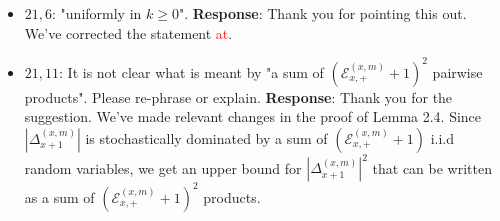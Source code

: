 \documentclass[11pt,a4paper]{article}
\numberwithin{equation}{section}
\newcommand{\abs}[1]{\left\vert #1 \right\vert}
\def\TBF#1{\textcolor{red}{#1}} %
\begin{document}
\begin{itemize}
		\item 
		$21,6$: "uniformly in $k\geq 0$".
		\subitem \textbf{Response}:  Thank you for pointing this out.  We've corrected the statement \TBF{at}. 
		
		\item 
		$21,11$: It is not clear what is meant by "a sum of $\left(\mathcal{E}^{(x,m)}_{x,+} +1 \right)^2$ pairwise products". Please re-phrase or explain.
		\subitem \textbf{Response}: Thank you for the suggestion. We've made relevant changes in the proof of Lemma 2.4. Since $\abs{\Delta_{x+1}^{(x,m)}}$ is stochastically dominated by a sum of $\left(\mathcal{E}^{(x,m)}_{x,+} +1\right)$ i.i.d random variables, we get an upper bound for $\abs{\Delta_{x+1}^{(x,m)}}^2$ that can be written as a sum of  $\left(\mathcal{E}^{(x,m)}_{x,+} +1\right)^2$ products. 
	\end{itemize}
	
	\newpage
\end{document}
